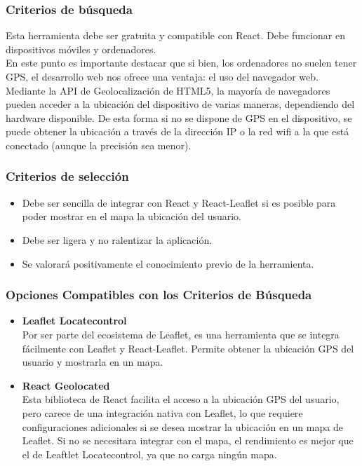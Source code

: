 \subsubsection{Criterios de búsqueda}
Esta herramienta debe ser gratuita y compatible con React. Debe funcionar en dispositivos móviles y ordenadores. \\

En este punto es importante destacar que si bien, los ordenadores no suelen tener GPS, el desarrollo web nos ofrece una ventaja: el uso del navegador web. Mediante la API de Geolocalización de HTML5\cite{geotargetly_html5_geolocation}, la mayoría de navegadores pueden acceder a la ubicación del dispositivo de varias maneras, dependiendo del hardware disponible. De esta forma si no se dispone de GPS en el dispositivo, se puede obtener la ubicación a través de la dirección IP o la red wifi a la que está conectado (aunque la precisión sea menor).

\subsubsection{Criterios de selección}
\begin{itemize}
    \item Debe ser sencilla de integrar con React y React-Leaflet si es posible para poder mostrar en el mapa la ubicación del usuario.
    \item Debe ser ligera y no ralentizar la aplicación.
    \item Se valorará positivamente el conocimiento previo de la herramienta. 
\end{itemize}

\subsubsection{Opciones Compatibles con los Criterios de Búsqueda} 
\begin{itemize} 
    \item \textbf{Leaflet Locatecontrol}\\
    Por ser parte del ecosistema de Leaflet, es una herramienta que se integra fácilmente con Leaflet y React-Leaflet. Permite obtener la ubicación GPS del usuario y mostrarla en un mapa. 
    \item \textbf{React Geolocated}\\
    Esta biblioteca de React facilita el acceso a la ubicación GPS del usuario, pero carece de una integración nativa con Leaflet, lo que requiere configuraciones adicionales si se desea mostrar la ubicación en un mapa de Leaflet. Si no se necesitara integrar con el mapa, el rendimiento es mejor que el de Leaftlet Locatecontrol, ya que no carga ningún mapa.
\end{itemize}

